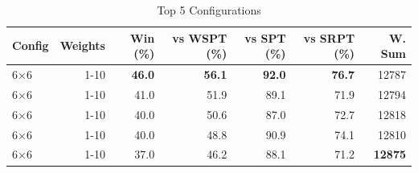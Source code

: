 \begin{table}[htbp]%
\centering%
\begin{tabular}{lrrrrrr}%
\toprule%
\textbf{Config}&\textbf{Weights}&\textbf{Win (\%)}&\textbf{vs WSPT (\%)}&\textbf{vs SPT (\%)}&\textbf{vs SRPT (\%)}&\textbf{W. Sum}\\%
\midrule%
6×6&1-10&\textbf{46.0}&\textbf{56.1}&\textbf{92.0}&\textbf{76.7}&12787\\%
6×6&1-10&41.0&51.9&89.1&71.9&12794\\%
6×6&1-10&40.0&50.6&87.0&72.7&12818\\%
6×6&1-10&40.0&48.8&90.9&74.1&12810\\%
6×6&1-10&37.0&46.2&88.1&71.2&\textbf{12875}\\%
\bottomrule%
\end{tabular}%
\caption{Top 5 Configurations}%
\label{tab:summary}%
\end{table}